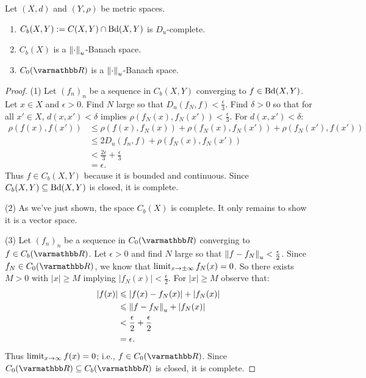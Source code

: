     \begin{corollary}
        Let $(X,d)$ and $(Y,\rho)$ be metric spaces.
        \begin{enumerate}[label = (\arabic*),itemsep=1pt,topsep=3pt]
            \item $C_b(X,Y) := C(X,Y) \cap \operatorname{Bd}(X,Y)$ is $D_u$-complete.
            \item $C_b(X)$ is a $\left\lVert \cdot \right\rVert_u$-Banach space.
            \item $C_0(\bfR)$ is a $\left\lVert \cdot \right\rVert_u$-Banach space.
        \end{enumerate}
    \end{corollary}
        \begin{proof}
            (1) Let $(f_n)_n$ be a sequence in $C_b(X,Y)$ converging to $f \in \operatorname{Bd}(X,Y)$. Let $x\in X$ and $\epsilon > 0$. Find $N$ large so that $D_u(f_N,f) < \frac{\epsilon}{3}$. Find $\delta > 0$ so that for all $x' \in X$, $d(x,x') < \delta$ implies $\rho(f_N(x),f_N(x')) < \frac{\epsilon}{3}$. For $d(x,x') < \delta$:
                \begin{equation*}
                \begin{split}
                    \rho(f(x),f(x'))
                    & \leq \rho(f(x),f_N(x)) + \rho(f_N(x),f_N(x')) + \rho(f_N(x'),f(x')) \\
                    & \leq 2D_u(f_n,f) + \rho(f_N(x),f_N(x')) \\
                    & < \frac{2\epsilon}{3} + \frac{\epsilon}{3} \\
                    & = \epsilon.
                \end{split}
                \end{equation*}
            Thus $f \in C_b(X,Y)$ because it is bounded and continuous. Since $C_b(X,Y) \subseteq \operatorname{Bd}(X,Y)$ is closed, it is complete.

            (2) As we've just shown, the space $C_b(X)$ is complete. It only remains to show it is a vector space.

            (3) Let $(f_n)_n$ be a sequence in $C_0(\bfR)$ converging to $f \in C_b(\bfR)$. Let $\epsilon > 0$ and find $N$ large so that $\left\lVert f - f_N \right\rVert_u < \frac{\epsilon}{2}$. Since $f_N \in C_0(\bfR)$, we know that $\operatorname*{limit}_{x \rightarrow \pm \infty}f_N(x) = 0$. So there exists $M > 0$ with $|x| \geq M$ implying $|f_N(x)| < \frac{\epsilon}{2}$. For $|x| \geq M$ observe that:
                \begin{equation*}
                \begin{split}
                    |f(x)|
                    & \leqslant |f(x) - f_N(x)| + |f_N(x)| \\
                    & \leqslant \left\lVert f - f_N \right\rVert_u + |f_N(x)| \\
                    & < \frac{\epsilon}{2} + \frac{\epsilon}{2} \\
                    & = \epsilon.
                \end{split}
                \end{equation*}
            Thus $\operatorname*{limit}_{x \rightarrow \infty}f(x) = 0$; i.e., $f \in C_0(\bfR)$. Since $C_0(\bfR) \subseteq C_b(\bfR)$ is closed, it is complete.
        \end{proof}

